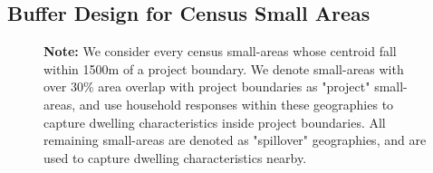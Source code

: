 \documentclass[12pt]{article}
\begin{document}
\subsection{Buffer Design for Census Small Areas}
\label{appendix:bufferdesign}

\vspace{-3mm}

\begin{figure}[h!]
\centering
{}
\vspace{2mm}
\caption*{\footnotesize {\bf Note:} We consider every census small-areas whose centroid fall within 1500m of a project boundary. We denote small-areas with over 30\% area overlap with project boundaries as "project" small-areas, and use household responses within these geographies to capture dwelling characteristics inside project boundaries. All remaining small-areas are denoted as "spillover" geographies, and are used to capture dwelling characteristics nearby.}
\end{figure}

\pagebreak
\end{document}
